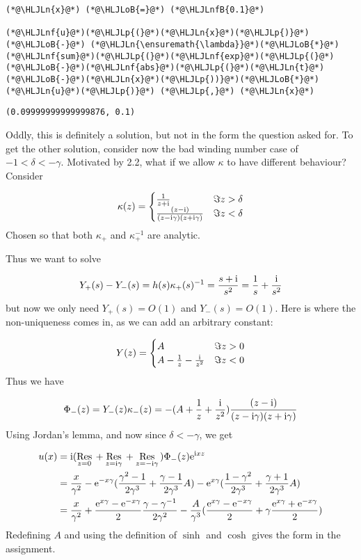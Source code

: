 \documentclass[12pt,landscape]{article}
\newcommand{\HLJLn}[1]{#1}
\newcommand{\HLJLnf}[1]{\textcolor[RGB]{66,102,213}{#1}}
\newcommand{\HLJLnfB}[1]{\textcolor[RGB]{59,151,46}{#1}}
\newcommand{\HLJLoB}[1]{\textcolor[RGB]{102,102,102}{\textbf{#1}}}
\newcommand{\HLJLp}[1]{#1}
\def\I{ {\rm i} }
\def\E{ {\rm e} }
\def\Res_#1{\underset{#1}{\rm Res}\,}
\begin{document}
{\begin{lstlisting}
(*@\HLJLn{x}@*) (*@\HLJLoB{=}@*) (*@\HLJLnfB{0.1}@*)

(*@\HLJLnf{u}@*)(*@\HLJLp{(}@*)(*@\HLJLn{x}@*)(*@\HLJLp{)}@*) (*@\HLJLoB{-}@*) (*@\HLJLn{\ensuremath{\lambda}}@*)(*@\HLJLoB{*}@*)(*@\HLJLnf{sum}@*)(*@\HLJLp{(}@*)(*@\HLJLnf{exp}@*)(*@\HLJLp{(}@*)(*@\HLJLoB{-}@*)(*@\HLJLnf{abs}@*)(*@\HLJLp{(}@*)(*@\HLJLn{t}@*)(*@\HLJLoB{-}@*)(*@\HLJLn{x}@*)(*@\HLJLp{))}@*)(*@\HLJLoB{*}@*)(*@\HLJLn{u}@*)(*@\HLJLp{)}@*) (*@\HLJLp{,}@*) (*@\HLJLn{x}@*)
\end{lstlisting}

\begin{lstlisting}
(0.09999999999999876, 0.1)
\end{lstlisting}


Oddly, this is definitely a solution, but not in the form the question asked for. To get the other solution, consider now the bad winding number case of $-1 < \delta < - \gamma$. Motivated by 2.2, what if we allow $\kappa$ to have different behaviour? Consider

\[
\kappa(z) = \begin{cases}
    {1 \over z + \I} & \Im z > \delta\\
    {(z-\I)  \over (z-\I  \gamma) (z+\I  \gamma)} & \Im z < \delta
    \end{cases}
\]
Chosen so that both $\kappa_+$ and $\kappa_+^{-1}$ are analytic.

Thus we want to solve

\[
Y_+(s) - Y_-(s) = h(s) \kappa_+(s)^{-1} =  { s + \I \over s^2} = {1 \over s} + {\I \over s^2}
\]
but now we only need $Y_+(s) = O(1)$ and $Y_-(s) = O(1)$. Here is where the non-uniqueness comes in, as we can add an arbitrary constant:

\[
Y(z) = \begin{cases}
                      A            & \Im z > 0 \\
   A -   {1 \over z} - {\I \over z^2} & \Im z < 0
\end{cases}
\]
Thus we have

\[
\Phi_-(z) = Y_-(z) \kappa_-(z) = -(  A +    {1 \over z} +  {\I \over z^2} ){(z-\I)  \over (z-\I  \gamma) (z+\I  \gamma)}
\]
Using Jordan's lemma, and now since $\delta < - \gamma$, we get


\begin{align*}
u(x) &= \I (\Res_{z = 0} + \Res_{z = \I \gamma} + \Res_{z = - \I \gamma})  \Phi_-(z) \E^{\I x z} \\
&= {x \over \gamma^2} - \E^{-x \gamma}( {\gamma^2-1 \over 2 \gamma^3} + {\gamma-1 \over 2\gamma^3}   A) - \E^{x \gamma} ({1-\gamma^2 \over 2 \gamma^3} + {\gamma+1 \over 2\gamma^3}   A)\\
&=  {x \over \gamma^2} + {\E^{x \gamma} - \E^{-x \gamma} \over 2} {\gamma-\gamma^{-1} \over 2 \gamma^2}  - {A \over \gamma^3} ( {\E^{x \gamma} - \E^{-x \gamma} \over 2} +  \gamma {\E^{x \gamma} + \E^{-x \gamma} \over 2} )
\end{align*}
Redefining $A$ and using the definition of $\sinh$ and $\cosh$ gives the form in the assignment.

}
\end{document}

